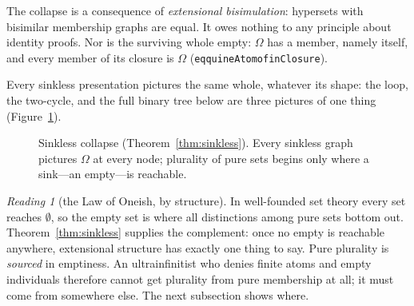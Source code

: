 \documentclass[]{article}
\theoremstyle{definition}
\theoremstyle{remark}
\newtheorem{reading}[theorem]{Reading}
\newcommand{\codeus}{\textunderscore\allowbreak}
\newcommand{\code}[1]{\texttt{\let\_\codeus #1}}
\newcommand{\Om}{\Omega}
\begin{document}
The collapse is a consequence of \emph{extensional bisimulation}: hypersets with bisimilar membership
graphs are equal. It owes nothing to any principle about identity proofs. Nor is the surviving whole
empty: $\Om$ has a member, namely itself, and every member of its closure is $\Om$
(\code{eq\_quineAtom\_of\_inClosure}).

Every sinkless presentation pictures the same whole, whatever its shape: the loop, the two-cycle,
and the full binary tree below are three pictures of one thing (Figure~\ref{fig:sinkless}).

\begin{figure}[H]
\centering
{}
\caption{Sinkless collapse (Theorem~\ref{thm:sinkless}). Every sinkless graph pictures $\Om$ at
every node; plurality of pure sets begins only where a sink---an empty---is reachable.}
\label{fig:sinkless}
\end{figure}

\begin{reading}[the Law of Oneish, by structure]
\label{read:oneish}
In well-founded set theory every set reaches $\emptyset$, so the empty set is where all
distinctions among pure sets bottom out. Theorem~\ref{thm:sinkless} supplies the complement: once no
empty is reachable anywhere, extensional structure has exactly one thing to say. Pure plurality is
\emph{sourced} in emptiness. An ultrainfinitist who denies finite atoms and empty individuals
therefore cannot get plurality from pure membership at all; it must come from somewhere else. The
next subsection shows where.
\end{reading}
\end{document}
